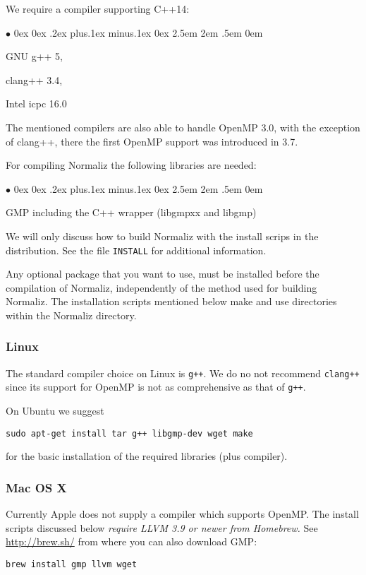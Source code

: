 \documentclass[12pt,a4paper]{scrartcl}
\newcommand{\stdli}{ \topsep0ex \partopsep0ex %
\parsep.2ex plus.1ex minus.1ex \itemsep0ex%
\leftmargin2.5em \labelwidth2em \labelsep.5em \rightmargin0em}%
\renewenvironment{itemize}{\begin{list}{{$\bullet$}}{\stdli}}{\end{list}}
\theoremstyle{definition}
\begin{document}
We require a compiler supporting C++14:
\begin{itemize}
	\item GNU g++ 5,
	\item clang++ 3.4,
	\item Intel icpc 16.0
\end{itemize}
The mentioned compilers are also able to handle OpenMP 3.0, with the exception of clang++, there the first OpenMP support was introduced in 3.7.

For compiling Normaliz the following libraries are needed:
\begin{itemize}
	\item GMP including the C++ wrapper (libgmpxx and libgmp)
\end{itemize}

We will only discuss how to build Normaliz with the install scrips in the distribution. See the file \verb|INSTALL| for additional information. 

Any optional package that you want to use, must be installed before the compilation of Normaliz, independently of the method used for building Normaliz. The installation scripts mentioned below make and use directories within the Normaliz directory.

\subsubsection{Linux}
The standard compiler choice on Linux is \verb|g++|. We do no not recommend \verb|clang++| since its support for OpenMP is not as comprehensive as that of \verb|g++|.

On Ubuntu we suggest
\begin{Verbatim}
sudo apt-get install tar g++ libgmp-dev wget make
\end{Verbatim}
for the basic installation of the required libraries (plus compiler).

\subsubsection{Mac OS X}\label{mac}

Currently Apple does not supply a compiler which supports OpenMP.
The install scripts discussed below \emph{require LLVM 3.9 or newer from Homebrew.} See
\url{http://brew.sh/} from where you can also download GMP:

\begin{Verbatim}
brew install gmp llvm wget
\end{Verbatim}
\end{document}
